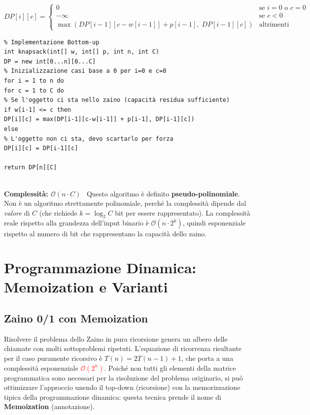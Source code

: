 \documentclass[12pt, a4paper]{article}
\begin{document}
$$DP[i][c] = \begin{cases} 0 & \text{se } i=0 \text{ o } c=0 \\ -\infty & \text{se } c < 0 \\ \max(DP[i-1][c-w[i-1]] + p[i-1], \; DP[i-1][c]) & \text{altrimenti} \end{cases}$$

\begin{verbatim}
% Implementazione Bottom-up
int knapsack(int[] w, int[] p, int n, int C)
DP = new int[0...n][0...C]
% Inizializzazione casi base a 0 per i=0 e c=0
for i = 1 to n do
for c = 1 to C do
% Se l'oggetto ci sta nello zaino (capacità residua sufficiente)
if w[i-1] <= c then
DP[i][c] = max(DP[i-1][c-w[i-1]] + p[i-1], DP[i-1][c])
else
% L'oggetto non ci sta, devo scartarlo per forza
DP[i][c] = DP[i-1][c]

return DP[n][C]


\end{verbatim}

\textbf{Complessità: $\mathcal{O}(n \cdot C)$} \
Questo algoritmo è definito \textbf{pseudo-polinomiale}. Non è un algoritmo strettamente polinomiale, perché la complessità dipende dal \textit{valore} di $C$ (che richiede $k = \log_2 C$ bit per essere rappresentato). La complessità reale rispetto alla grandezza dell'input binario è $\mathcal{O}(n \cdot 2^k)$, quindi esponenziale rispetto al numero di bit che rappresentano la capacità dello zaino.





\section{Programmazione Dinamica: Memoization e Varianti}

\subsection{Zaino 0/1 con Memoization}
Risolvere il problema dello Zaino in pura ricorsione genera un albero delle chiamate con molti sottoproblemi ripetuti. L'equazione di ricorrenza risultante per il caso puramente ricorsivo è $T(n) = 2T(n-1) + 1$, che porta a una complessità esponenziale \textcolor{red}{$\mathcal{O}(2^n)$}.
Poiché non tutti gli elementi della matrice programmatica sono necessari per la risoluzione del problema originario, si può ottimizzare l'approccio unendo il top-down (ricorsione) con la memorizzazione tipica della programmazione dinamica: questa tecnica prende il nome di \textbf{Memoization} (annotazione).
\end{document}
